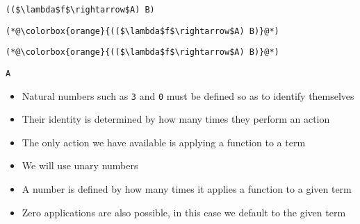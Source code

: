 \documentclass{beamer}
\begin{document}
\begin{frame}[fragile]{\CurrentSection}
\lstset{basicstyle=\ttfamily\small}\lstset{numbers=none}\lstset{language=ML}\begin{lstlisting}
(($\lambda$f$\rightarrow$A) B)
\end{lstlisting}
\pause\lstset{language=ML}\begin{lstlisting}
(*@\colorbox{orange}{(($\lambda$f$\rightarrow$A) B)}@*)
\end{lstlisting}

\end{frame}

\begin{frame}[fragile]{\CurrentSection}
\lstset{basicstyle=\ttfamily\small}\lstset{numbers=none}\lstset{language=ML}\begin{lstlisting}
(*@\colorbox{orange}{(($\lambda$f$\rightarrow$A) B)}@*)
\end{lstlisting}
\pause\lstset{language=ML}\begin{lstlisting}
A
\end{lstlisting}

\end{frame}

\begin{frame}[fragile]{\CurrentSection}
\begin{block}{\CurrentSubSection}
\begin{itemize}
\item Natural numbers such as \texttt{3} and \texttt{0} must be defined so as to identify themselves
\item Their identity is determined by how many times they perform an action
\item The only action we have available is applying a function to a term

\end{itemize}

\end{block}


\end{frame}

\begin{frame}[fragile]{\CurrentSection}
\begin{block}{\CurrentSubSection}
\begin{itemize}
\item We will use unary numbers
\item A number is defined by how many times it applies a function to a given term
\item Zero applications are also possible, in this case we default to the given term

\end{itemize}

\end{block}


\end{frame}
\end{document}
